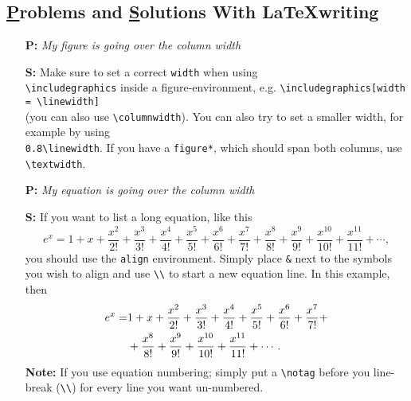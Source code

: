 \documentclass[fleqn,10pt]{SelfArx} %
\begin{document}
\subsection*{\underline{P}roblems and \underline{S}olutions With \LaTeX\:writing}
\begin{enumerate}[nolistsep]
    \item[\textbf{P:}] \textit{My figure is going over the column width}
    \item[\textbf{S:}] Make sure to set a correct \texttt{width} when using \\
    \texttt{\textbackslash includegraphics} inside a figure-environment, e.g. \texttt{\textbackslash includegraphics[width = \textbackslash linewidth]}\\ 
    (you can also use \texttt{\textbackslash columnwidth}). You can also try to set a smaller width, for example by using \\ \texttt{0.8\textbackslash linewidth}. If you have a \texttt{figure*}, which should span both columns, use \texttt{\textbackslash textwidth}. \\
    
    
    \item[\textbf{P:}] \textit{My equation is going over the column width}
    \item[\textbf{S:}] If you want to list a long equation, like this
    \begin{equation}
        e^x =1+x+\frac{x^{2}}{2 !}+\frac{x^{3}}{3 !}+\frac{x^{4}}{4 !}+\frac{x^{5}}{5 !}+\frac{x^{6}}{6 !}+\frac{x^{7}}{7 !}+\frac{x^{8}}{8 !}+\frac{x^{9}}{9 !}+\frac{x^{10}}{10 !}+\frac{x^{11}}{11 !}+\cdots,
    \end{equation}   
    you should use the \texttt{align} environment. Simply place \texttt{\&} next to the symbols you wish to align and use \texttt{\textbackslash\textbackslash} to start a new equation line. In this example, then
    \begin{align}
        e^x = &1+x+\frac{x^{2}}{2 !}+\frac{x^{3}}{3 !}+\frac{x^{4}}{4 !}+\frac{x^{5}}{5 !}+\frac{x^{6}}{6 !}+\frac{x^{7}}{7 !}+\notag\\ 
        &+\frac{x^{8}}{8 !}+\frac{x^{9}}{9 !}+\frac{x^{10}}{10 !}+\frac{x^{11}}{11 !}+\cdots.
    \end{align}
    \textbf{Note:} If you use equation numbering; simply put a \texttt{\textbackslash notag} before you line-break (\texttt{\textbackslash\textbackslash}) for every line you want un-numbered.\\
    

\end{enumerate}
\end{document}

